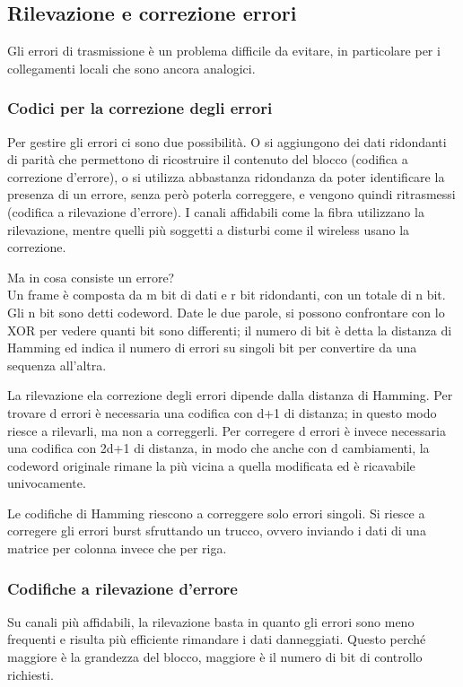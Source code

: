 \subsection{Rilevazione e correzione errori} %
Gli errori di trasmissione è un problema difficile da evitare, in particolare per i collegamenti locali che sono ancora analogici.

\subsubsection{Codici per la correzione degli errori}
Per gestire gli errori ci sono due possibilità. 
O si aggiungono dei dati ridondanti di parità che permettono di ricostruire il contenuto del blocco (codifica a correzione d'errore),
o si utilizza abbastanza ridondanza da poter identificare la presenza di un errore, senza però poterla correggere, e vengono quindi ritrasmessi (codifica a rilevazione d'errore).
I canali affidabili come la fibra utilizzano la rilevazione, mentre quelli più soggetti a disturbi come il wireless usano la correzione.

Ma in cosa consiste un errore? \\
Un frame è composta da m bit di dati e r bit ridondanti, con un totale di n bit.
Gli n bit sono detti codeword. 
Date le due parole, si possono confrontare con lo XOR per vedere quanti bit sono differenti;
il numero di bit è detta la distanza di Hamming ed indica il numero di errori su singoli bit per convertire da una sequenza all'altra.

La rilevazione ela correzione degli errori dipende dalla distanza di Hamming.
Per trovare d errori è necessaria una codifica con d+1 di distanza;
in questo modo riesce a rilevarli, ma non a correggerli.
Per corregere d errori è invece necessaria una codifica con 2d+1 di distanza,
in modo che anche con d cambiamenti, la codeword originale rimane la più vicina a quella modificata ed è ricavabile univocamente.

Le codifiche di Hamming riescono a correggere solo errori singoli.
Si riesce a corregere gli errori burst sfruttando un trucco, ovvero inviando i dati di una matrice per colonna invece che per riga.

\subsubsection{Codifiche a rilevazione d'errore}
Su canali più affidabili, la rilevazione basta in quanto gli errori sono meno frequenti e risulta più efficiente rimandare i dati danneggiati.
Questo perché maggiore è la grandezza del blocco, maggiore è il numero di bit di controllo richiesti.


